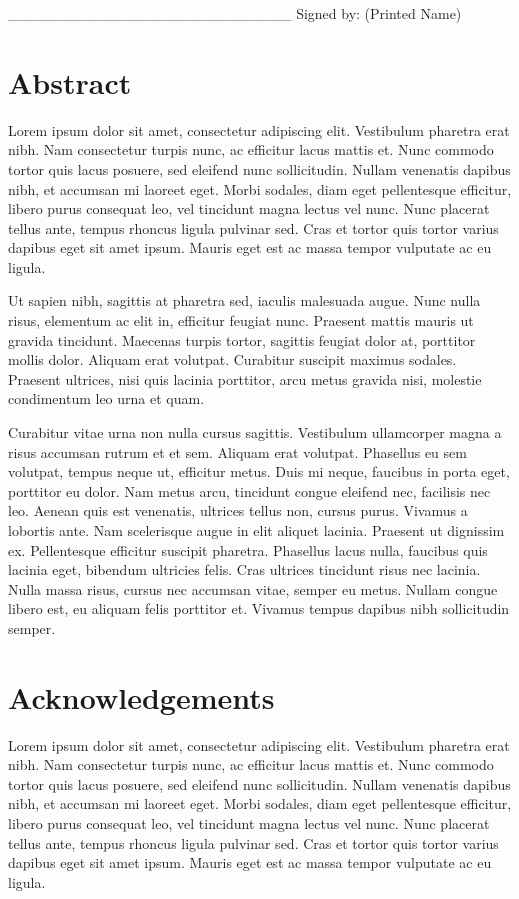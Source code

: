 \documentclass[a4paper]{memoir}
\begin{document}
\_\_\_\_\_\_\_\_\_\_\_\_\_\_\_\_\_\_\_\_\_\_\_\_\_\_\_
Signed by: (Printed Name)

\chapter*{Abstract}
\label{abstract}

Lorem ipsum dolor sit amet, consectetur adipiscing elit. Vestibulum pharetra erat nibh. Nam consectetur turpis nunc, ac efficitur lacus mattis et. Nunc commodo tortor quis lacus posuere, sed eleifend nunc sollicitudin. Nullam venenatis dapibus nibh, et accumsan mi laoreet eget. Morbi sodales, diam eget pellentesque efficitur, libero purus consequat leo, vel tincidunt magna lectus vel nunc. Nunc placerat tellus ante, tempus rhoncus ligula pulvinar sed. Cras et tortor quis tortor varius dapibus eget sit amet ipsum. Mauris eget est ac massa tempor vulputate ac eu ligula. 

Ut sapien nibh, sagittis at pharetra sed, iaculis malesuada augue. Nunc nulla risus, elementum ac elit in, efficitur feugiat nunc. Praesent mattis mauris ut gravida tincidunt. Maecenas turpis tortor, sagittis feugiat dolor at, porttitor mollis dolor. Aliquam erat volutpat. Curabitur suscipit maximus sodales. Praesent ultrices, nisi quis lacinia porttitor, arcu metus gravida nisi, molestie condimentum leo urna et quam. 

Curabitur vitae urna non nulla cursus sagittis. Vestibulum ullamcorper magna a risus accumsan rutrum et et sem. Aliquam erat volutpat. Phasellus eu sem volutpat, tempus neque ut, efficitur metus. Duis mi neque, faucibus in porta eget, porttitor eu dolor. Nam metus arcu, tincidunt congue eleifend nec, facilisis nec leo. Aenean quis est venenatis, ultrices tellus non, cursus purus. Vivamus a lobortis ante. Nam scelerisque augue in elit aliquet lacinia. Praesent ut dignissim ex. Pellentesque efficitur suscipit pharetra. Phasellus lacus nulla, faucibus quis lacinia eget, bibendum ultricies felis. Cras ultrices tincidunt risus nec lacinia. Nulla massa risus, cursus nec accumsan vitae, semper eu metus. Nullam congue libero est, eu aliquam felis porttitor et. Vivamus tempus dapibus nibh sollicitudin semper. 

\chapter*{Acknowledgements}
\label{acknowledgements}

Lorem ipsum dolor sit amet, consectetur adipiscing elit. Vestibulum pharetra erat nibh. Nam consectetur turpis nunc, ac efficitur lacus mattis et. Nunc commodo tortor quis lacus posuere, sed eleifend nunc sollicitudin. Nullam venenatis dapibus nibh, et accumsan mi laoreet eget. Morbi sodales, diam eget pellentesque efficitur, libero purus consequat leo, vel tincidunt magna lectus vel nunc. Nunc placerat tellus ante, tempus rhoncus ligula pulvinar sed. Cras et tortor quis tortor varius dapibus eget sit amet ipsum. Mauris eget est ac massa tempor vulputate ac eu ligula. 
\end{document}
